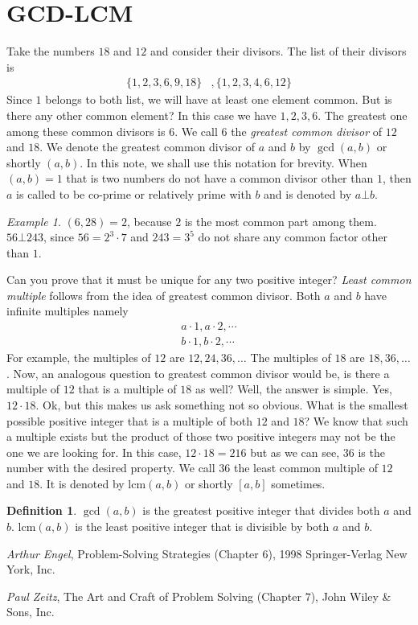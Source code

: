 \documentclass[a4paper, leqno]{article}
\theoremstyle{definition}
\newtheorem{definition}{Definition}
\theoremstyle{remark}
\newtheorem*{example}{Example}
\newcommand{\lcm}{\text{lcm}}
\begin{document}
	\section{GCD-LCM}
		Take the numbers $18$ and $12$ and consider their divisors. The list of their divisors is
			\begin{align*}
				\{1,2,3,6,9,18\} & , \{1,2,3,4,6,12\}
			\end{align*}
		Since $1$ belongs to both list, we will have at least one element common. But is there any other common element? In this case we have $1,2,3,6$. The greatest one among these common divisors is $6$. We call $6$ the \textit{greatest common divisor} of $12$ and $18$. We denote the greatest common divisor of $a$ and $b$ by $\gcd(a,b)$ or shortly $(a,b)$. In this note, we shall use this notation for brevity. When $(a,b) = 1$ that is two numbers do not have a common divisor other than $1$, then $a$ is called to be co-prime or relatively
		prime with $b$ and is denoted by $a \bot b$.
			\begin{example}
				$(6,28) = 2$, because $2$ is the most common part among them. $56\bot 243$, since $56=2^3\cdot7$ and $243=3^5$ do not share any common factor other than $1$.
			\end{example}
		Can you prove that it must be unique for any two positive integer? \textit{Least common multiple} follows from the idea of greatest common divisor. Both $a$ and $b$ have infinite multiples namely
			\begin{align*}
				a\cdot1,a\cdot2,\cdots\\
				b\cdot1,b\cdot2,\cdots
			\end{align*}
		For example, the multiples of $12$ are $12,24,36,\ldots$ The multiples of $18$ are $18,36,\ldots$. Now, an analogous question to greatest common divisor would be, is there a multiple of $12$ that is a multiple of $18$ as well? Well, the answer is simple. Yes, $12\cdot18$. Ok, but this makes us ask something not so obvious. What is the smallest possible positive integer that is a multiple of both $12$ and $18$? We know that such a multiple exists but the product of those two positive integers may not be the one we are looking for. In this case, $12\cdot18=216$ but as we can see, $36$ is the number with the desired property. We call $36$ the least common multiple of $12$ and $18$. It is denoted by $\lcm(a,b)$ or shortly $[a,b]$ sometimes.
			\begin{definition}
				$\gcd(a,b)$ is the greatest positive integer that divides both $a$ and $b$. $\lcm(a,b)$ is the least positive integer that is divisible by both $a$ and $b$.
			\end{definition}
	\begin{thebibliography}{99}
		 \textit{Arthur Engel}, Problem-Solving Strategies (Chapter $6$), 1998 Springer-Verlag New York, Inc.
		
		 \textit{Paul Zeitz}, The Art and Craft of Problem Solving (Chapter $7$), John Wiley \& Sons, Inc.
		
	\end{thebibliography}
\end{document}
